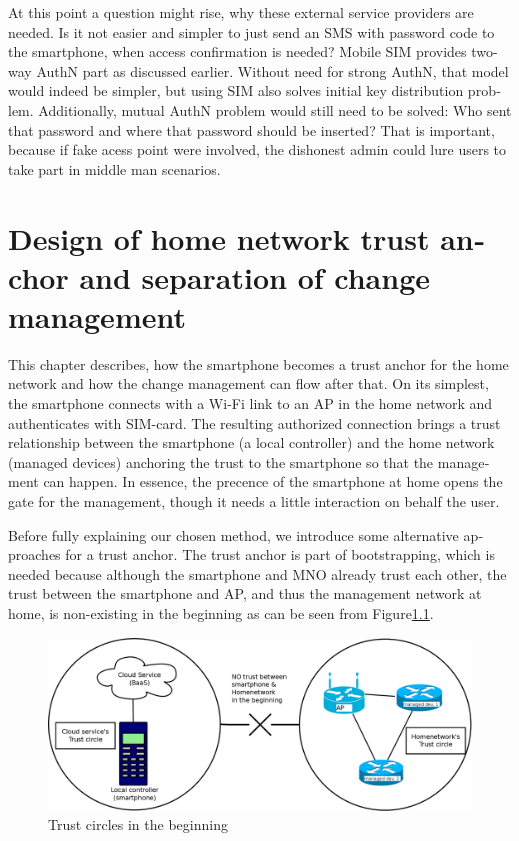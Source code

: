 \documentclass[12pt,a4paper,english]{tutthesis}
\begin{document}
\begin{otherlanguage}{english}
At this point a question might rise, why these external service
providers are needed. Is it not easier and simpler to just send 
an SMS with password code to the smartphone, when access confirmation is needed?
Mobile SIM provides two-way AuthN part as discussed earlier.
Without need for strong AuthN, that model would indeed be 
simpler, but using SIM also solves initial key distribution problem.
Additionally, mutual AuthN problem would still need to be solved:
Who sent that password and where that password should be inserted?
That is important, because if fake acess point were involved, the 
dishonest admin could lure users to take part in middle man scenarios.





\chapter{Design of home network trust anchor and separation of change management}
\label{sec-4}





This chapter describes, how the smartphone becomes a trust anchor for
the home network and how the change management can flow after that.
On its simplest, the smartphone connects with a Wi-Fi link to an
AP in the home network and authenticates with SIM-card.
The resulting authorized connection brings a trust relationship
between the smartphone (a local controller)
and the home network (managed devices) anchoring the trust to the smartphone so that the 
management can happen. 
In essence, the precence of the smartphone at home
opens the gate for the management, though it needs a little
interaction on behalf the user.



Before fully explaining our chosen method, we introduce some 
alternative
approaches for a trust anchor. The trust anchor is part of bootstrapping,
which is needed because although the smartphone and MNO
already trust each other, the trust between the smartphone and AP, and
thus the management network at home, is non-existing in the
beginning as can be seen from Figure\ref{fig:trustbegin}.

\begin{figure}[htb]
\centering
\includegraphics[width=.9\linewidth]{trustcircles.png}
\caption{\label{fig:trustbegin}Trust circles in the beginning}
\end{figure}



\end{otherlanguage}
\end{document}
